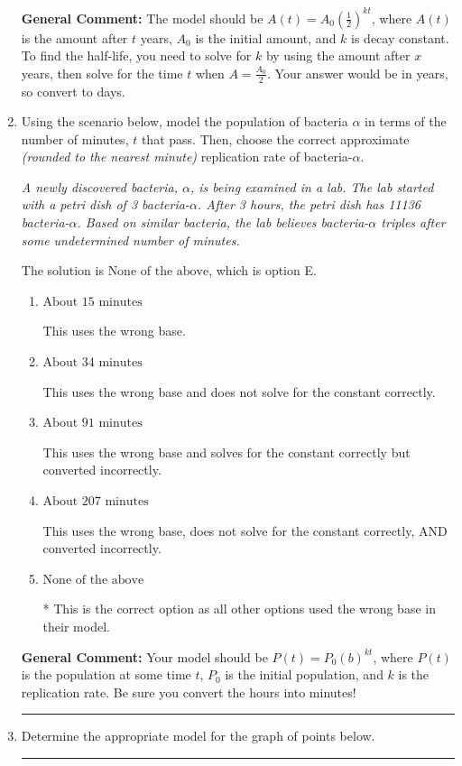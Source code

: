 \documentclass{extbook}[14pt]
\newcommand{\litem}[1]{\item #1

\rule{\textwidth}{0.4pt}}
\begin{document}
\begin{enumerate}
{\textbf{General Comment:} The model should be $A(t) = A_0 (\frac{1}{2})^{kt}$, where $A(t)$ is the amount after $t$ years, $A_0$ is the initial amount, and $k$ is decay constant. To find the half-life, you need to solve for $k$ by using the amount after $x$ years, then solve for the time $t$ when $A = \frac{A_0}{2}$. Your answer would be in years, so convert to days.
}
\litem{
Using the scenario below, model the population of bacteria $\alpha$ in terms of the number of minutes, $t$ that pass. Then, choose the correct approximate \textit{(rounded to the nearest minute)} replication rate of bacteria-$\alpha$.

\begin{center}
    \textit{ A newly discovered bacteria, $\alpha$, is being examined in a lab. The lab started with a petri dish of 3 bacteria-$\alpha$. After 3 hours, the petri dish has 11136 bacteria-$\alpha$. Based on similar bacteria, the lab believes bacteria-$\alpha$ triples after some undetermined number of minutes. }
\end{center}
The solution is \( \text{None of the above} \), which is option E.\begin{enumerate}[label=\Alph*.]
\item \( \text{About } 15 \text{ minutes} \)

This uses the wrong base.
\item \( \text{About } 34 \text{ minutes} \)

This uses the wrong base and does not solve for the constant correctly.
\item \( \text{About } 91 \text{ minutes} \)

This uses the wrong base and solves for the constant correctly but converted incorrectly.
\item \( \text{About } 207 \text{ minutes} \)

This uses the wrong base, does not solve for the constant correctly, AND converted incorrectly.
\item \( \text{None of the above} \)

* This is the correct option as all other options used the wrong base in their model.
\end{enumerate}

\textbf{General Comment:} Your model should be $P(t) = P_0(b)^{kt}$, where $P(t)$ is the population at some time $t$, $P_0$ is the initial population, and $k$ is the replication rate. Be sure you convert the hours into minutes!
}
\litem{
Determine the appropriate model for the graph of points below.

}
\end{enumerate}
\end{document}
